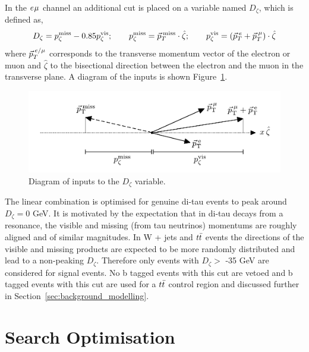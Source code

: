 In the $e_{}\mu_{}$ channel an additional cut is placed on a variable named $D_{\zeta}$, which is defined as,
\begin{equation}
D_\zeta = p_\zeta^\text{miss} - 0.85 p_\zeta^\text{vis};\qquad
p_\zeta^\text{miss} = \vec{p}_{T}^{\hspace{2pt}\text{miss}} \cdot \hat{\zeta};\qquad
p_\zeta^\text{vis} = (\vec{p}_{T}^{\hspace{2pt}e} + \vec{p}_{T}^{\hspace{2pt}\mu}) \cdot \hat{\zeta}
\label{eqn:Dzeta_def}
\end{equation}
where $\vec{p}_{T}^{\hspace{2pt}e/\mu}$ corresponds to the transverse momentum vector of the electron or muon and $\hat{\zeta}$ to the bisectional direction between the electron and the muon in the transverse plane.
A diagram of the inputs is shown Figure~\ref{fig:dzeta_diagram}. \\
\begin{figure}[!hbtp]
\centering
    \includegraphics[width=1.0\textwidth]{Figures/dzeta_diagram.pdf}
\caption{Diagram of inputs to the $D_\zeta$ variable.}
\label{fig:dzeta_diagram}
\end{figure}

The linear combination is optimised for genuine di-tau events to peak around $D_{\zeta} = 0$ GeV. 
It is motivated by the expectation that in di-tau decays from a resonance, the visible and missing (from tau neutrinos) momentums are roughly aligned and of similar magnitudes.
In W + jets and $t\bar{t}$ events the directions of the visible and missing products are expected to be more randomly distributed and lead to a non-peaking $D_{\zeta}$.
Therefore only events with $D_\zeta >$ -35 GeV are considered for signal events.
No b tagged events with this cut are vetoed and b tagged events with this cut are used for a $t\bar{t}$ control region and discussed further in Section~\ref{sec:background_modelling}.

\section{Search Optimisation}
\label{sec:search_optimisation}

